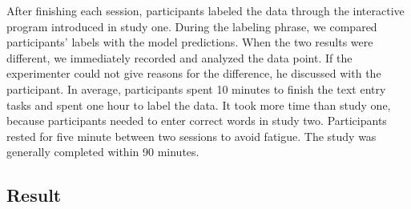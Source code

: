 After finishing each session, participants labeled the data through the interactive program introduced in study one. During the labeling phrase, we compared participants' labels with the model predictions. When the two results were different, we immediately recorded and analyzed the data point. If the experimenter could not give reasons for the difference, he discussed with the participant.
In average, participants spent 10 minutes to finish the text entry tasks and spent one hour to label the data. It took more time than study one, because participants needed to enter correct words in study two. Participants rested for five minute between two sessions to avoid fatigue. The study was generally completed within 90 minutes.





\subsection{Result}

